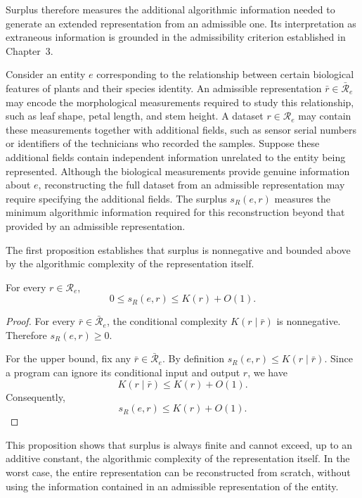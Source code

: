 Surplus therefore measures the additional algorithmic information needed to generate an extended representation from an admissible one. Its interpretation as extraneous information is grounded in the admissibility criterion established in Chapter~3.

\begin{example}
\label{ex:surplus_irrelevant_variable}
Consider an entity $e$ corresponding to the relationship between certain biological features of plants and their species identity. An admissible representation $\bar r\in\bar{\mathcal R}_e$ may encode the morphological measurements required to study this relationship, such as leaf shape, petal length, and stem height. A dataset $r\in\mathcal R_e$ may contain these measurements together with additional fields, such as sensor serial numbers or identifiers of the technicians who recorded the samples. Suppose these additional fields contain independent information unrelated to the entity being represented. Although the biological measurements provide genuine information about $e$, reconstructing the full dataset from an admissible representation may require specifying the additional fields. The surplus $s_R(e,r)$ measures the minimum algorithmic information required for this reconstruction beyond that provided by an admissible representation.
\end{example}

The first proposition establishes that surplus is nonnegative and bounded above by the algorithmic complexity of the representation itself.

\begin{proposition}
\label{prop:surplus_upper_bound}
For every $r\in\mathcal R_e$,
\[
0 \le s_R(e,r) \le K(r)+O(1).
\]
\end{proposition}
\begin{proof}
For every $\bar r\in\bar{\mathcal R}_e$, the conditional complexity $K(r\mid\bar r)$ is nonnegative. Therefore $s_R(e,r) \ge 0$.

For the upper bound, fix any $\bar r\in\bar{\mathcal R}_e$. By definition $s_R(e,r) \le K(r\mid\bar r)$. Since a program can ignore its conditional input and output $r$, we have
\[
K(r\mid\bar r) \le K(r) + O(1).
\]
Consequently,
\[
s_R(e,r) \le K(r) + O(1).
\]
\end{proof}

This proposition shows that surplus is always finite and cannot exceed, up to an additive constant, the algorithmic complexity of the representation itself. In the worst case, the entire representation can be reconstructed from scratch, without using the information contained in an admissible representation of the entity.

